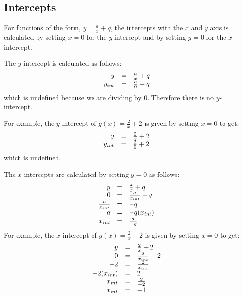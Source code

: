 \subsection*{Intercepts}
\nopagebreak
For functions of the form, $y=\frac{a}{x}+q$, the intercepts with the $x$ and $y$ axis is calculated by setting $x=0$ for the $y$-intercept and by setting $y=0$ for the $x$-intercept.\par 
The $y$-intercept is calculated as follows:
\begin{equation*}
\begin{array}{ccc}\hfill y& =& \frac{a}{x}+q\hfill \\
 \hfill {y}_{int}& =& \frac{a}{0}+q\hfill 
\end{array}
\end{equation*}
which is undefined because we are dividing by $0$. Therefore there is no $y$-intercept.\par 
For example, the $y$-intercept of $g(x)=\frac{2}{x}+2$ is given by setting $x=0$ to get:
\begin{equation*}
\begin{array}{ccc}\hfill y& =& \frac{2}{x}+2\hfill \\
 \hfill {y}_{int}& =& \frac{2}{0}+2\hfill 
\end{array}
\end{equation*}
which is undefined.\par 
The $x$-intercepts are calculated by setting $y=0$ as follows:\
\begin{equation*}
\begin{array}{ccc}\hfill y& =& \frac{a}{x}+q\hfill \\
 \hfill 0& =& \frac{a}{{x}_{int}}+q\hfill \\
 \hfill \frac{a}{{x}_{int}}& =& -q\hfill \\
 \hfill a& =& -q({x}_{int})\hfill \\
 \hfill {x}_{int}& =& \frac{a}{-q}\hfill 
\end{array}
\end{equation*}
For example, the $x$-intercept of $g(x)=\frac{2}{x}+2$ is given by setting $x=0$ to get:
\begin{equation*}
\begin{array}{ccc}\hfill y& =& \frac{2}{x}+2\hfill \\
 \hfill 0& =& \frac{2}{{x}_{int}}+2\hfill \\
 \hfill -2& =& \frac{2}{{x}_{int}}\hfill \\
 \hfill -2({x}_{int})& =& 2\hfill \\
 \hfill {x}_{int}& =& \frac{2}{-2}\hfill \\
 \hfill {x}_{int}& =& -1\hfill 
\end{array}
\end{equation*}

